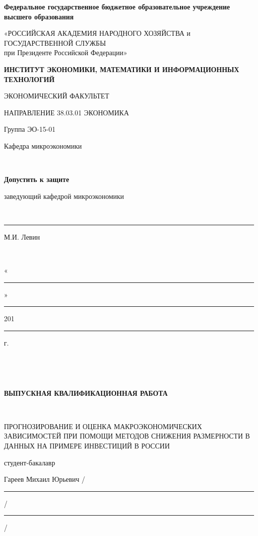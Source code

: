 
\thispagestyle{empty} %


\begingroup
{} 
\begin{center}
\small \bfseries Федеральное государственное бюджетное образовательное учреждение высшего образования

«РОССИЙСКАЯ АКАДЕМИЯ НАРОДНОГО ХОЗЯЙСТВА и\\ ГОСУДАРСТВЕННОЙ СЛУЖБЫ \\
при Президенте Российской Федерации»

\vspace{2ex}

\bfseries
ИНСТИТУТ ЭКОНОМИКИ, МАТЕМАТИКИ И ИНФОРМАЦИОННЫХ\\ ТЕХНОЛОГИЙ

ЭКОНОМИЧЕСКИЙ ФАКУЛЬТЕТ 

НАПРАВЛЕНИЕ 38.03.01 ЭКОНОМИКА
\end{center}

\vfill

\noindent Группа ЭО-15-01
\hfill
\parbox[t]{20em}{\centering 
Кафедра микроэкономики

\mbox{ }

\textbf{Допустить к защите}

заведующий кафедрой микроэкономики

\mbox{ }

\rule{8em}{0.5pt} М.И. Левин

\mbox{ }

«\rule{2em}{0.5pt}» \rule{5em}{0.5pt} 201\rule{1em}{0.5pt} г. }

\mbox{ }

\mbox{ }

\begin{center}\bfseries
ВЫПУСКНАЯ КВАЛИФИКАЦИОННАЯ РАБОТА

\mbox{ }

\large
ПРОГНОЗИРОВАНИЕ И ОЦЕНКА МАКРОЭКОНОМИЧЕСКИХ ЗАВИСИМОСТЕЙ ПРИ ПОМОЩИ
МЕТОДОВ СНИЖЕНИЯ РАЗМЕРНОСТИ В ДАННЫХ НА ПРИМЕРЕ ИНВЕСТИЦИЙ В РОССИИ
\end{center}

\vfill

\noindent\normalsize
студент-бакалавр

\noindent
Гареев Михаил Юрьевич
\hfill /\rule{6em}{0.5pt}/\rule{6em}{0.5pt}/


